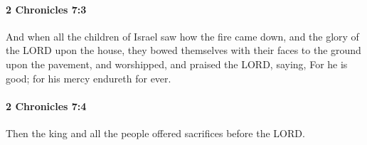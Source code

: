 		\paragraph{2 Chronicles 7:3} %
			\label{2CHRONICLES-7-3}

			And when all the children of Israel saw how the fire came down, and the glory of the LORD upon the house, they bowed themselves with their faces to the ground upon the pavement, and worshipped, and praised the LORD, saying, For he is good; for his mercy endureth for ever.


		\paragraph{2 Chronicles 7:4} %
			\label{2CHRONICLES-7-4}

			Then the king and all the people offered sacrifices before the LORD.


